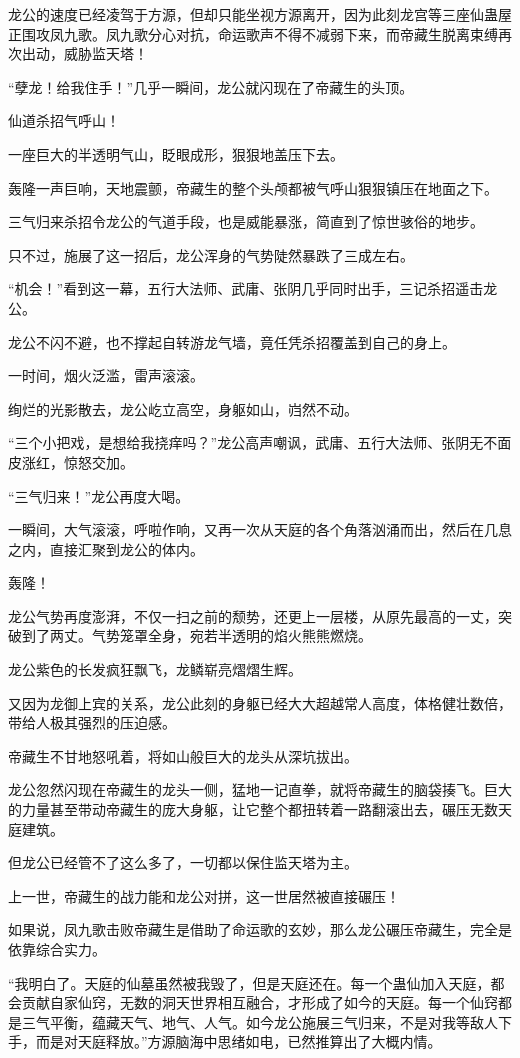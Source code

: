 \begin{this_body}
龙公的速度已经凌驾于方源，但却只能坐视方源离开，因为此刻龙宫等三座仙蛊屋正围攻凤九歌。凤九歌分心对抗，命运歌声不得不减弱下来，而帝藏生脱离束缚再次出动，威胁监天塔！

“孽龙！给我住手！”几乎一瞬间，龙公就闪现在了帝藏生的头顶。

仙道杀招气呼山！

一座巨大的半透明气山，眨眼成形，狠狠地盖压下去。

轰隆一声巨响，天地震颤，帝藏生的整个头颅都被气呼山狠狠镇压在地面之下。

三气归来杀招令龙公的气道手段，也是威能暴涨，简直到了惊世骇俗的地步。

只不过，施展了这一招后，龙公浑身的气势陡然暴跌了三成左右。

“机会！”看到这一幕，五行大法师、武庸、张阴几乎同时出手，三记杀招遥击龙公。

龙公不闪不避，也不撑起自转游龙气墙，竟任凭杀招覆盖到自己的身上。

一时间，烟火泛滥，雷声滚滚。

绚烂的光影散去，龙公屹立高空，身躯如山，岿然不动。

“三个小把戏，是想给我挠痒吗？”龙公高声嘲讽，武庸、五行大法师、张阴无不面皮涨红，惊怒交加。

“三气归来！”龙公再度大喝。

一瞬间，大气滚滚，呼啦作响，又再一次从天庭的各个角落汹涌而出，然后在几息之内，直接汇聚到龙公的体内。

轰隆！

龙公气势再度澎湃，不仅一扫之前的颓势，还更上一层楼，从原先最高的一丈，突破到了两丈。气势笼罩全身，宛若半透明的焰火熊熊燃烧。

龙公紫色的长发疯狂飘飞，龙鳞崭亮熠熠生辉。

又因为龙御上宾的关系，龙公此刻的身躯已经大大超越常人高度，体格健壮数倍，带给人极其强烈的压迫感。

帝藏生不甘地怒吼着，将如山般巨大的龙头从深坑拔出。

龙公忽然闪现在帝藏生的龙头一侧，猛地一记直拳，就将帝藏生的脑袋揍飞。巨大的力量甚至带动帝藏生的庞大身躯，让它整个都扭转着一路翻滚出去，碾压无数天庭建筑。

但龙公已经管不了这么多了，一切都以保住监天塔为主。

上一世，帝藏生的战力能和龙公对拼，这一世居然被直接碾压！

如果说，凤九歌击败帝藏生是借助了命运歌的玄妙，那么龙公碾压帝藏生，完全是依靠综合实力。

“我明白了。天庭的仙墓虽然被我毁了，但是天庭还在。每一个蛊仙加入天庭，都会贡献自家仙窍，无数的洞天世界相互融合，才形成了如今的天庭。每一个仙窍都是三气平衡，蕴藏天气、地气、人气。如今龙公施展三气归来，不是对我等敌人下手，而是对天庭释放。”方源脑海中思绪如电，已然推算出了大概内情。


\end{this_body}
